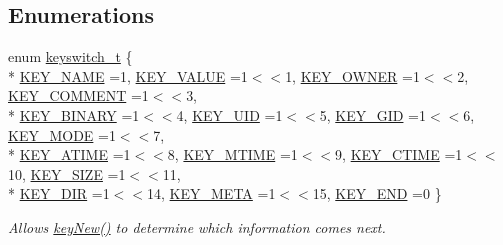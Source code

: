 \subsection*{Enumerations}
\begin{DoxyCompactItemize}
\item 
enum \hyperlink{group__key_ga91fb3178848bd682000958089abbaf40}{keyswitch\-\_\-t} \{ \\*
\hyperlink{group__key_gga91fb3178848bd682000958089abbaf40ad6127fc38f96410bf7c8f6e93b0397da}{K\-E\-Y\-\_\-\-N\-A\-M\-E} =1, 
\hyperlink{group__key_gga91fb3178848bd682000958089abbaf40ac66e4a49d09212b79f5754ca6db5bd2e}{K\-E\-Y\-\_\-\-V\-A\-L\-U\-E} =1$<$$<$1, 
\hyperlink{group__key_gga91fb3178848bd682000958089abbaf40a77ca60362fa8daca8d5347db4385068b}{K\-E\-Y\-\_\-\-O\-W\-N\-E\-R} =1$<$$<$2, 
\hyperlink{group__key_gga91fb3178848bd682000958089abbaf40ac29427bb47cc31689d02912e36161ee3}{K\-E\-Y\-\_\-\-C\-O\-M\-M\-E\-N\-T} =1$<$$<$3, 
\\*
\hyperlink{group__key_gga91fb3178848bd682000958089abbaf40a1ca18d4e094ae7487d35ecedda2235ff}{K\-E\-Y\-\_\-\-B\-I\-N\-A\-R\-Y} =1$<$$<$4, 
\hyperlink{group__key_gga91fb3178848bd682000958089abbaf40a28f01a87d65f065172f734c9c9446c0e}{K\-E\-Y\-\_\-\-U\-I\-D} =1$<$$<$5, 
\hyperlink{group__key_gga91fb3178848bd682000958089abbaf40ac0628bbaba7c837ca73323681393d15f}{K\-E\-Y\-\_\-\-G\-I\-D} =1$<$$<$6, 
\hyperlink{group__key_gga91fb3178848bd682000958089abbaf40a1b0a91ff3a855d6993930ebf0abaa518}{K\-E\-Y\-\_\-\-M\-O\-D\-E} =1$<$$<$7, 
\\*
\hyperlink{group__key_gga91fb3178848bd682000958089abbaf40af303f9ebb4983d7500ba8e06ef3ec178}{K\-E\-Y\-\_\-\-A\-T\-I\-M\-E} =1$<$$<$8, 
\hyperlink{group__key_gga91fb3178848bd682000958089abbaf40abfbab4bf55be6c53a7ffb2e43a82b355}{K\-E\-Y\-\_\-\-M\-T\-I\-M\-E} =1$<$$<$9, 
\hyperlink{group__key_gga91fb3178848bd682000958089abbaf40afbad53ecfc1512b1b49ca04b57a628b4}{K\-E\-Y\-\_\-\-C\-T\-I\-M\-E} =1$<$$<$10, 
\hyperlink{group__key_gga91fb3178848bd682000958089abbaf40a6d531b5c41445d19d0452eebdccbfa01}{K\-E\-Y\-\_\-\-S\-I\-Z\-E} =1$<$$<$11, 
\\*
\hyperlink{group__key_gga91fb3178848bd682000958089abbaf40a9e43e47c8a21478538e2d20e049981d5}{K\-E\-Y\-\_\-\-D\-I\-R} =1$<$$<$14, 
\hyperlink{group__key_gga91fb3178848bd682000958089abbaf40a040582834bb2d90049947d7ef74e87e2}{K\-E\-Y\-\_\-\-M\-E\-T\-A} =1$<$$<$15, 
\hyperlink{group__key_gga91fb3178848bd682000958089abbaf40aa8adb6fcb92dec58fb19410eacfdd403}{K\-E\-Y\-\_\-\-E\-N\-D} =0
 \}
\begin{DoxyCompactList}\small\item\em Allows \hyperlink{group__key_gad23c65b44bf48d773759e1f9a4d43b89}{key\-New()} to determine which information comes next. \end{DoxyCompactList}\end{DoxyCompactItemize}
